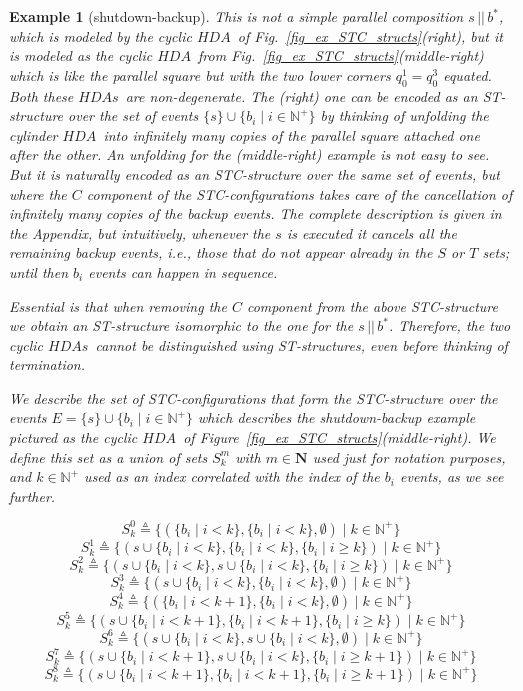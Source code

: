 \documentclass[submission,copyright,creativecommons]{eptcs}
\newtheorem{example}[theorem]{Example}
\newcommand\HDA{\ensuremath{\mathit{HDA}}}
\newcommand\HDAs{\ensuremath{\mathit{HDAs}}}
\newcommand\defequal{\ensuremath{\stackrel{\vartriangle}{=}}}
\begin{document}
\begin{example}[shutdown-backup]
This is not a simple parallel composition $s\, ||\, b^{*}$, which is modeled by the cyclic \HDA\ of Fig.~\ref{fig_ex_STC_structs}(right), but it is modeled as the cyclic \HDA\ from Fig.~\ref{fig_ex_STC_structs}(middle-right) which is like the parallel square but with the two lower corners  $q_{0}^{1}=q_{0}^{3}$ equated.
Both these \HDAs\ are non-degenerate. The (right) one can be encoded as an ST-structure over the set of events $\{s\}\cup\{b_{i}\mid i\in\mathbb{N}^{+}\}$ by thinking of unfolding the cylinder \HDA\ into infinitely many copies of the parallel square attached one after the other.
An unfolding for the (middle-right) example is not easy to see. But it is naturally encoded as an STC-structure over the same set of events, but where the $C$ component of the STC-configurations takes care of the cancellation of infinitely many copies of the backup events. The complete description is given in the Appendix, but intuitively, whenever the $s$ is executed it cancels all the remaining backup events, i.e., those that do not appear already in the $S$ or $T$ sets; until then $b_{i}$ events can happen in sequence.

Essential is that when removing the $C$ component from the above STC-structure we obtain an ST-structure isomorphic to the one for the $s\, ||\, b^{*}$. Therefore, the two cyclic \HDAs\ cannot be distinguished using ST-structures, even before thinking of termination.
 


We describe the set of STC-configurations that form the STC-structure over the events $E=\{s\}\cup\{b_{i}\mid i\in\mathbb{N}^{+}\}$ which describes the shutdown-backup example pictured as the cyclic \HDA\ of Figure~\ref{fig_ex_STC_structs}(middle-right). We define this set as a union of sets $S_{k}^{m}$ with $m\in\mathbf{N}$ used just for notation purposes, and $k\in\mathbb{N}^{+}$ used as an index correlated with the index of the $b_{i}$ events, as we see further.

\[
S_{k}^{0}\defequal\{(\{b_{i}\mid i<k\},\{b_{i}\mid i<k\},\emptyset)\mid k\in\mathbb{N}^{+}\}
\]
\[
S_{k}^{1}\defequal\{(s\cup\{b_{i}\mid i<k\},\{b_{i}\mid i<k\},\{b_{i}\mid i\geq k\})\mid k\in\mathbb{N}^{+}\}
\]
\[
S_{k}^{2}\defequal\{(s\cup\{b_{i}\mid i<k\},s\cup\{b_{i}\mid i<k\},\{b_{i}\mid i\geq k\})\mid k\in\mathbb{N}^{+}\}
\]
\[
S_{k}^{3}\defequal\{(s\cup\{b_{i}\mid i<k\},\{b_{i}\mid i<k\},\emptyset)\mid k\in\mathbb{N}^{+}\}
\]
\[
S_{k}^{4}\defequal\{(\{b_{i}\mid i<k+1\},\{b_{i}\mid i<k\},\emptyset)\mid k\in\mathbb{N}^{+}\}
\]
\[
S_{k}^{5}\defequal\{(s\cup\{b_{i}\mid i<k+1\},\{b_{i}\mid i<k+1\},\{b_{i}\mid i\geq k\})\mid k\in\mathbb{N}^{+}\}
\]
\[
S_{k}^{6}\defequal\{(s\cup\{b_{i}\mid i<k\},s\cup\{b_{i}\mid i<k\},\emptyset)\mid k\in\mathbb{N}^{+}\}
\]
\[
S_{k}^{7}\defequal\{(s\cup\{b_{i}\mid i<k+1\},s\cup\{b_{i}\mid i<k\},\{b_{i}\mid i\geq k+1\})\mid k\in\mathbb{N}^{+}\}
\]
\[
S_{k}^{8}\defequal\{(s\cup\{b_{i}\mid i<k+1\},\{b_{i}\mid i<k+1\},\{b_{i}\mid i\geq k+1\})\mid k\in\mathbb{N}^{+}\}
\]


\end{example}
\end{document}
